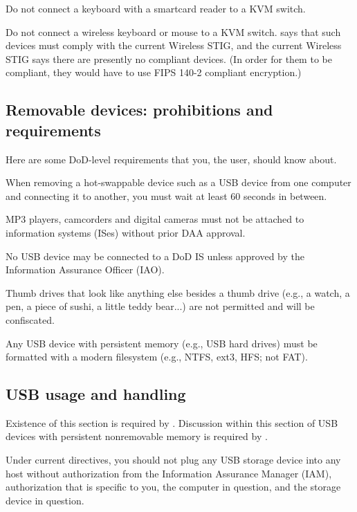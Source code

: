  Do not connect a keyboard with a
smartcard reader to a KVM switch.

 Do not connect a wireless keyboard
or mouse to a KVM switch.  says that such devices
must comply with the current Wireless STIG, and the current Wireless STIG
says there are presently no compliant devices. (In order for them to be
compliant, they would have to use FIPS 140-2 compliant encryption.)


\subsection{Removable devices: prohibitions and requirements}

Here are some DoD-level requirements that you, the user, should know
about.

 When removing a hot-swappable
device such as a USB device from one computer and connecting it to
another, you must wait at least 60 seconds in between.

 MP3 players, camcorders and digital
cameras must not be attached to information systems (ISes) without prior
DAA approval.

 No USB device may be connected to a
DoD IS unless approved by the Information Assurance Officer (IAO).

 Thumb drives that look like anything
else besides a thumb drive (e.g., a watch, a pen, a piece of sushi, a
little teddy bear...) are not permitted and will be confiscated.

 Any USB device with persistent
memory (e.g., USB hard drives) must be formatted with a modern filesystem
(e.g., NTFS, ext3, HFS; not FAT).


\subsection{USB usage and handling}

 Existence of this section is required
by .  Discussion
within this section of USB devices with persistent nonremovable memory is
required by .

Under current directives, you should not plug any USB storage device into
any host without authorization from the Information Assurance Manager
(IAM), authorization that is specific to you, the computer in question,
and the storage device in question.


